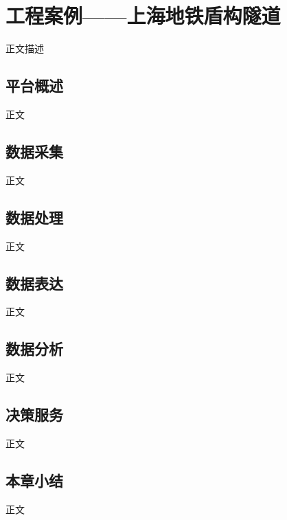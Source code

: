 \chapter{工程案例——上海地铁盾构隧道}
\label{chap:case}

正文描述

\section{平台概述}

正文




\section{数据采集}

正文




\section{数据处理}

正文




\section{数据表达}

正文




\section{数据分析}

正文




\section{决策服务}

正文




\section{本章小结}

正文